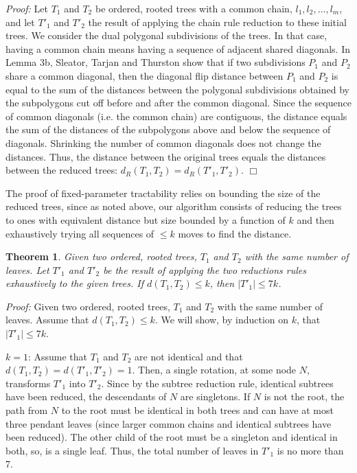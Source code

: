 \documentclass[12pt]{article}
\newtheorem{theorem}{Theorem}
\begin{document}
{\em Proof:}  
Let $T_1$ and $T_2$ be ordered, rooted trees with a common chain, 
$l_1,l_2,\ldots,l_m$, and let $T'_1$ and $T'_2$ the result of applying the chain
rule reduction to these initial trees.  
We consider the dual polygonal subdivisions of the trees.  In that case,
having a common chain means having a sequence of adjacent shared diagonals.
In Lemma 3b, Sleator, Tarjan and Thurston  \cite{stt} 
show that if two subdivisions $P_1$ and $P_2$ share a common diagonal, then 
the diagonal flip distance between $P_1$ and $P_2$ is equal to the sum 
of the distances between the polygonal subdivisions obtained by the subpolygons
cut off before and after the common diagonal.   
Since the sequence of common diagonals (i.e. the common chain) 
are contiguous, the distance equals the sum of the distances of the subpolygons
above and below the sequence of diagonals.  Shrinking the number
of common diagonals does not change the distances.  Thus, the 
distance between the original trees equals the distances between
the reduced trees:  $d_R(T_1,T_2) = d_R(T'_1,T'_2)$.
\hfill $\Box$


The proof of fixed-parameter tractability relies on bounding the size of 
the reduced trees, since as noted above, our algorithm
consists of reducing the trees to ones with equivalent 
distance but size bounded by a function of $k$ and then 
exhaustively trying all sequences of $\leq k$ moves
to find the distance.


\begin{theorem}
\label{lemdistsame}  Given two ordered, rooted trees, $T_1$ and $T_2$
with the same number of leaves.  Let 
$T'_1$ and $T'_2$ be the result of applying the two 
reductions rules exhaustively to the given trees. 
If $d(T_1,T_2) \leq k$, then $|T'_1| \leq 7k$.
\end{theorem}

{\em Proof:}
Given two ordered, rooted trees, $T_1$ and $T_2$
with the same number of leaves.  Assume 
that $d(T_1,T_2) \leq k$.  
We will show, by induction on $k$, that $|T'_1| \leq 7k$.

$k=1$:  Assume that $T_1$ and $T_2$ are not 
identical and that $d(T_1,T_2) = d(T'_1,T'_2) = 1$.  Then, a single
rotation, at some node $N$, transforms $T'_1$ into $T'_2$.
Since by the subtree reduction rule, identical subtrees
have been reduced, the descendants of $N$ are 
singletons.  If $N$ is not the root, the path from $N$ to
the root must be identical in both trees and can have
at most three pendant leaves (since larger common 
chains and identical subtrees have been reduced).
The other child of the root must be a singleton and 
identical in both, so, is a single leaf.   Thus, the total 
number of leaves in $T'_1$ is no more than 7.
\end{document}
